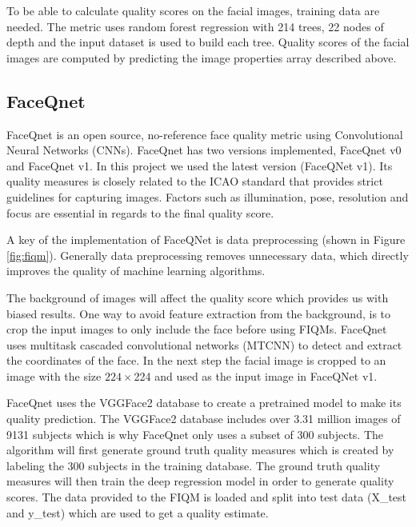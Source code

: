 To be able to calculate quality scores on the facial images, training data are needed. The metric uses random forest regression \cite{RandomForestRegressor} with 214 trees, 22 nodes of depth and the input dataset is used to build each tree. Quality scores of the facial images are computed by predicting the image properties array described above. 

\subsection{FaceQnet}
FaceQnet \cite{FaceQnet} is an open source, no-reference face quality metric using Convolutional Neural Networks (CNNs). FaceQnet has two versions implemented, FaceQnet v0 and FaceQnet v1. In this project we used the latest version (FaceQNet v1). Its quality measures is closely related to the ICAO \cite{ICAO2} standard that provides strict guidelines for capturing images. Factors such as illumination, pose, resolution and focus are essential in regards to the final quality score.

A key of the implementation of FaceQNet is data preprocessing (shown in Figure \ref{fig:fiqm}). Generally data preprocessing removes unnecessary data, which directly improves the quality of machine learning algorithms. 

The background of images will affect the quality score which provides us with biased results. One way to avoid feature extraction from the background, is to crop the input images to only include the face before using FIQMs. FaceQnet uses multitask cascaded convolutional networks (MTCNN) to detect and extract the coordinates of the face. In the next step the facial image is cropped to an image with the size $224 \times $224 and used as the input image in FaceQNet v1. 

FaceQnet uses the VGGFace2 \cite{VGGFace2} database to create a pretrained model to make its quality prediction. The VGGFace2 database includes over 3.31 million images of 9131 subjects which is why FaceQnet only uses a subset of 300 subjects. The algorithm will first generate ground truth quality measures which is created by labeling the 300 subjects in the training database. The ground truth quality measures will then train the deep regression model in order to generate quality scores. The data provided to the FIQM is loaded and split into test data (X\_test and y\_test) which are used to get a quality estimate. 

